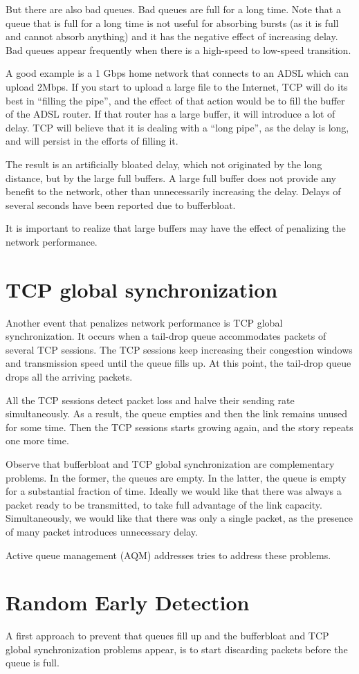 But there are also bad queues.
Bad queues are full for a long time.
Note that a queue that is full for a long time is not useful for absorbing bursts (as it is full and cannot absorb anything) and it has the negative effect of increasing delay.
Bad queues appear frequently when there is a high-speed to low-speed transition.

A good example is a 1 Gbps home network that connects to an ADSL which can upload 2Mbps.
If you start to upload a large file to the Internet, TCP will do its best in ``filling the pipe'', and the effect of that action would be to fill the buffer of the ADSL router.
If that router has a large buffer, it will introduce a lot of delay.
TCP will believe that it is dealing with a ``long pipe'', as the delay is long, and will persist in the efforts of filling it.

The result is an artificially bloated delay, which not originated by the long distance, but by the large full buffers.
A large full buffer does not provide any benefit to the network, other than unnecessarily increasing the delay.
Delays of several seconds have been reported due to bufferbloat.

It is important to realize that large buffers may have the effect of penalizing the network performance.

\section{TCP global synchronization}

Another event that penalizes network performance is TCP global synchronization.
It occurs when a tail-drop queue accommodates packets of several TCP sessions.
The TCP sessions keep increasing their congestion windows and transmission speed until the queue fills up.
At this point, the tail-drop queue drops all the arriving packets.

All the TCP sessions detect packet loss and halve their sending rate simultaneously.
As a result, the queue empties and then the link remains unused for some time.
Then the TCP sessions starts growing again, and the story repeats one more time.

Observe that bufferbloat and TCP global synchronization are complementary problems.
In the former, the queues are empty.
In the latter, the queue is empty for a substantial fraction of time.
Ideally we would like that there was always a packet ready to be transmitted, to take full advantage of the link capacity.
Simultaneously, we would like that there was only a single packet, as the presence of many packet introduces unnecessary delay.

Active queue management (AQM) addresses tries to address these problems.

\section{Random Early Detection}

A first approach to prevent that queues fill up and the bufferbloat and TCP global synchronization problems appear, is to start discarding packets before the queue is full.



